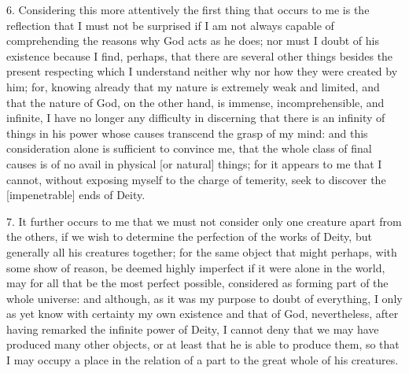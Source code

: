 6. Considering this more attentively the first thing that occurs to me is the reflection that I must not be surprised if I am not always capable of comprehending the reasons why God acts as he does; nor must I doubt of his existence because I find, perhaps, that there are several other things besides the present respecting which I understand neither why nor how they were created by him; for, knowing already that my nature is extremely weak and limited, and that the nature of God, on the other hand, is immense, incomprehensible, and infinite, I have no longer any difficulty in discerning that there is an infinity of things in his power whose causes transcend the grasp of my mind: and this consideration alone is sufficient to convince me, that the whole class of final causes is of no avail in physical [or natural] things; for it appears to me that I cannot, without exposing myself to the charge of temerity, seek to discover the [impenetrable] ends of Deity.

7. It further occurs to me that we must not consider only one creature apart from the others, if we wish to determine the perfection of the works of Deity, but generally all his creatures together; for the same object that might perhaps, with some show of reason, be deemed highly imperfect if it were alone in the world, may for all that be the most perfect possible, considered as forming part of the whole universe: and although, as it was my purpose to doubt of everything, I only as yet know with certainty my own existence and that of God, nevertheless, after having remarked the infinite power of Deity, I cannot deny that we may have produced many other objects, or at least that he is able to produce them, so that I may occupy a place in the relation of a part to the great whole of his creatures.

